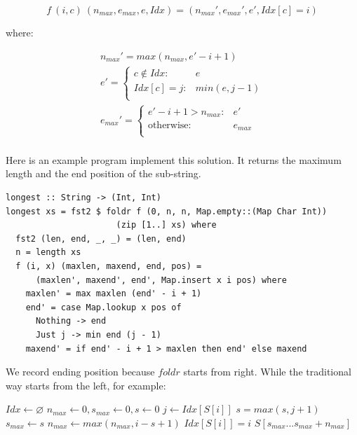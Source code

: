 \documentclass[b5paper]{article}
\begin{document}
\begin{Answer}[ref={ex:foldr}]
{\[
f\ (i, c)\ (n_{max}, e_{max}, e, Idx) = (n_{max}', e_{max}', e', Idx[c] = i)
\]

where:

\[ \begin{array}{l}
n_{max}' = max(n_{max}, e' - i + 1) \\
e' = \begin{cases}
  c \notin Idx: & e \\
  Idx[c] = j: & min(e, j - 1) \\
  \end{cases} \\
e_{max}' = \begin{cases}
  e' - i + 1 > n_{max}: & e' \\
  \text{otherwise}: & e_{max} \\
  \end{cases} \\
\end{array} \]

Here is an example program implement this solution. It returns the maximum length and the end position of the sub-string.

\lstset{frame=single}
\begin{lstlisting}
longest :: String -> (Int, Int)
longest xs = fst2 $ foldr f (0, n, n, Map.empty::(Map Char Int))
                      (zip [1..] xs) where
  fst2 (len, end, _, _) = (len, end)
  n = length xs
  f (i, x) (maxlen, maxend, end, pos) =
      (maxlen', maxend', end', Map.insert x i pos) where
    maxlen' = max maxlen (end' - i + 1)
    end' = case Map.lookup x pos of
      Nothing -> end
      Just j -> min end (j - 1)
    maxend' = if end' - i + 1 > maxlen then end' else maxend
\end{lstlisting}

We record ending position because $foldr$ starts from right. While the traditional way starts from the left, for example:

\begin{algorithmic}
  \State $Idx \gets \varnothing$
  \State $n_{max} \gets 0, s_{max} \gets 0, s \gets 0$
      \State $j \gets Idx[S[i]]$
      \State $s = max(s, j + 1)$
    \EndIf
      \State $s_{max} \gets s$
    \EndIf
    \State $n_{max} \gets max(n_{max}, i - s + 1)$
    \State $Idx[S[i]] = i$
  \EndFor
  \State \Return $S[s_{max} ... s_{max} + n_{max}]$
\EndFunction
\end{algorithmic}

}
\end{Answer}
\end{document}
